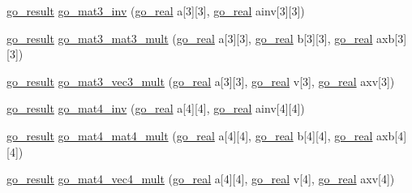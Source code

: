 \begin{DoxyCompactItemize}
\item 
\hyperlink{gotypes_8h_a55d48b38cd959f63c7e8db8337a9792a}{go\-\_\-result} \hyperlink{namespacegomotion_ad60afe8680a8b58625d3b6c104d77bbd}{go\-\_\-mat3\-\_\-inv} (\hyperlink{gotypes_8h_afd666a2393eebd71ee455846ac9def9b}{go\-\_\-real} a\mbox{[}3\mbox{]}\mbox{[}3\mbox{]}, \hyperlink{gotypes_8h_afd666a2393eebd71ee455846ac9def9b}{go\-\_\-real} ainv\mbox{[}3\mbox{]}\mbox{[}3\mbox{]})
\item 
\hyperlink{gotypes_8h_a55d48b38cd959f63c7e8db8337a9792a}{go\-\_\-result} \hyperlink{namespacegomotion_aec10cf06c1177abebc9b55c77fb6d662}{go\-\_\-mat3\-\_\-mat3\-\_\-mult} (\hyperlink{gotypes_8h_afd666a2393eebd71ee455846ac9def9b}{go\-\_\-real} a\mbox{[}3\mbox{]}\mbox{[}3\mbox{]}, \hyperlink{gotypes_8h_afd666a2393eebd71ee455846ac9def9b}{go\-\_\-real} b\mbox{[}3\mbox{]}\mbox{[}3\mbox{]}, \hyperlink{gotypes_8h_afd666a2393eebd71ee455846ac9def9b}{go\-\_\-real} axb\mbox{[}3\mbox{]}\mbox{[}3\mbox{]})
\item 
\hyperlink{gotypes_8h_a55d48b38cd959f63c7e8db8337a9792a}{go\-\_\-result} \hyperlink{namespacegomotion_a2f3046912ba704f1aba092455a073172}{go\-\_\-mat3\-\_\-vec3\-\_\-mult} (\hyperlink{gotypes_8h_afd666a2393eebd71ee455846ac9def9b}{go\-\_\-real} a\mbox{[}3\mbox{]}\mbox{[}3\mbox{]}, \hyperlink{gotypes_8h_afd666a2393eebd71ee455846ac9def9b}{go\-\_\-real} v\mbox{[}3\mbox{]}, \hyperlink{gotypes_8h_afd666a2393eebd71ee455846ac9def9b}{go\-\_\-real} axv\mbox{[}3\mbox{]})
\item 
\hyperlink{gotypes_8h_a55d48b38cd959f63c7e8db8337a9792a}{go\-\_\-result} \hyperlink{namespacegomotion_a85fbe89cb8863fc4dc9d674c56780e8a}{go\-\_\-mat4\-\_\-inv} (\hyperlink{gotypes_8h_afd666a2393eebd71ee455846ac9def9b}{go\-\_\-real} a\mbox{[}4\mbox{]}\mbox{[}4\mbox{]}, \hyperlink{gotypes_8h_afd666a2393eebd71ee455846ac9def9b}{go\-\_\-real} ainv\mbox{[}4\mbox{]}\mbox{[}4\mbox{]})
\item 
\hyperlink{gotypes_8h_a55d48b38cd959f63c7e8db8337a9792a}{go\-\_\-result} \hyperlink{namespacegomotion_a05e897fff802f77058a689e1dd3c5211}{go\-\_\-mat4\-\_\-mat4\-\_\-mult} (\hyperlink{gotypes_8h_afd666a2393eebd71ee455846ac9def9b}{go\-\_\-real} a\mbox{[}4\mbox{]}\mbox{[}4\mbox{]}, \hyperlink{gotypes_8h_afd666a2393eebd71ee455846ac9def9b}{go\-\_\-real} b\mbox{[}4\mbox{]}\mbox{[}4\mbox{]}, \hyperlink{gotypes_8h_afd666a2393eebd71ee455846ac9def9b}{go\-\_\-real} axb\mbox{[}4\mbox{]}\mbox{[}4\mbox{]})
\item 
\hyperlink{gotypes_8h_a55d48b38cd959f63c7e8db8337a9792a}{go\-\_\-result} \hyperlink{namespacegomotion_a1253a2e409550fa643fff3ecbf9909b8}{go\-\_\-mat4\-\_\-vec4\-\_\-mult} (\hyperlink{gotypes_8h_afd666a2393eebd71ee455846ac9def9b}{go\-\_\-real} a\mbox{[}4\mbox{]}\mbox{[}4\mbox{]}, \hyperlink{gotypes_8h_afd666a2393eebd71ee455846ac9def9b}{go\-\_\-real} v\mbox{[}4\mbox{]}, \hyperlink{gotypes_8h_afd666a2393eebd71ee455846ac9def9b}{go\-\_\-real} axv\mbox{[}4\mbox{]})

\end{DoxyCompactItemize}
